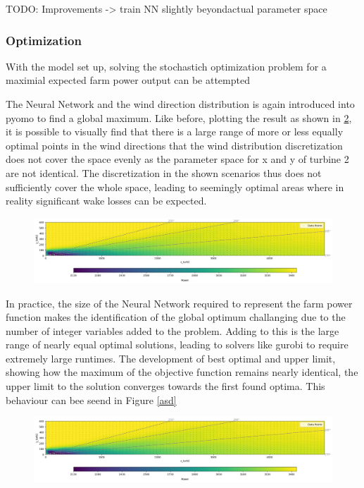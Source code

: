 TODO: Improvements -> train NN slightly beyondactual parameter space

\subsubsection{Optimization}

With the model set up, solving the stochastich optimization problem for a maximial expected farm power output can be attempted

The Neural Network and the wind direction distribution is  again introduced into pyomo to find a global maximum. Like before, plotting the result as shown in \ref{fig:prob_data_lininter}, it is possible to visually find that there is a large range of more or less equally optimal points in the wind directions that the wind distribution discretization does not cover the space evenly as the parameter space for x and y of turbine 2 are not identical. The discretization in the shown scenarios thus does not sufficiently cover the whole space, leading to seemingly optimal areas where in reality significant wake losses can be expected.


\begin{figure}[h] 
	\centering
	\includegraphics[width=1\textwidth]{figures/optimization/prob_data_lininter.png} 
	\caption{}
	\label{fig:prob_data_lininter}
\end{figure}

In practice, the size of the Neural Network required to represent the farm power function makes the identification of the global optimum challanging due to the number of integer variables added to the problem. Adding to this is the large range of nearly equal optimal solutions, leading to solvers like gurobi to require extremely large runtimes. The development of best optimal and upper limit, showing how the maximum of the objective function remains nearly identical, the upper limit to the solution converges towards the first found optima. This behaviour can bee seend in Figure \ref{asd}

\begin{figure}[h] 
	\centering
	\includegraphics[width=1\textwidth]{figures/optimization/prob_data_lininter.png} 
	\caption{}
	\label{fig:prob_data_lininter}
\end{figure} 

